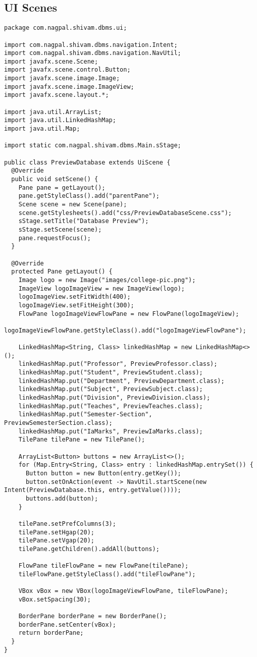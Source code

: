 \subsection{UI Scenes}
\thispagestyle{fancy}
\begin{lstlisting}[caption=PreviewDatabase.java]
package com.nagpal.shivam.dbms.ui;

import com.nagpal.shivam.dbms.navigation.Intent;
import com.nagpal.shivam.dbms.navigation.NavUtil;
import javafx.scene.Scene;
import javafx.scene.control.Button;
import javafx.scene.image.Image;
import javafx.scene.image.ImageView;
import javafx.scene.layout.*;

import java.util.ArrayList;
import java.util.LinkedHashMap;
import java.util.Map;

import static com.nagpal.shivam.dbms.Main.sStage;

public class PreviewDatabase extends UiScene {
  @Override
  public void setScene() {
    Pane pane = getLayout();
    pane.getStyleClass().add("parentPane");
    Scene scene = new Scene(pane);
    scene.getStylesheets().add("css/PreviewDatabaseScene.css");
    sStage.setTitle("Database Preview");
    sStage.setScene(scene);
    pane.requestFocus();
  }

  @Override
  protected Pane getLayout() {
    Image logo = new Image("images/college-pic.png");
    ImageView logoImageView = new ImageView(logo);
    logoImageView.setFitWidth(400);
    logoImageView.setFitHeight(300);
    FlowPane logoImageViewFlowPane = new FlowPane(logoImageView);
    logoImageViewFlowPane.getStyleClass().add("logoImageViewFlowPane");

    LinkedHashMap<String, Class> linkedHashMap = new LinkedHashMap<>();
    linkedHashMap.put("Professor", PreviewProfessor.class);
    linkedHashMap.put("Student", PreviewStudent.class);
    linkedHashMap.put("Department", PreviewDepartment.class);
    linkedHashMap.put("Subject", PreviewSubject.class);
    linkedHashMap.put("Division", PreviewDivision.class);
    linkedHashMap.put("Teaches", PreviewTeaches.class);
    linkedHashMap.put("Semester-Section", PreviewSemesterSection.class);
    linkedHashMap.put("IaMarks", PreviewIaMarks.class);
    TilePane tilePane = new TilePane();

    ArrayList<Button> buttons = new ArrayList<>();
    for (Map.Entry<String, Class> entry : linkedHashMap.entrySet()) {
      Button button = new Button(entry.getKey());
      button.setOnAction(event -> NavUtil.startScene(new Intent(PreviewDatabase.this, entry.getValue())));
      buttons.add(button);
    }

    tilePane.setPrefColumns(3);
    tilePane.setHgap(20);
    tilePane.setVgap(20);
    tilePane.getChildren().addAll(buttons);

    FlowPane tileFlowPane = new FlowPane(tilePane);
    tileFlowPane.getStyleClass().add("tileFlowPane");

    VBox vBox = new VBox(logoImageViewFlowPane, tileFlowPane);
    vBox.setSpacing(30);

    BorderPane borderPane = new BorderPane();
    borderPane.setCenter(vBox);
    return borderPane;
  }
}

\end{lstlisting}

